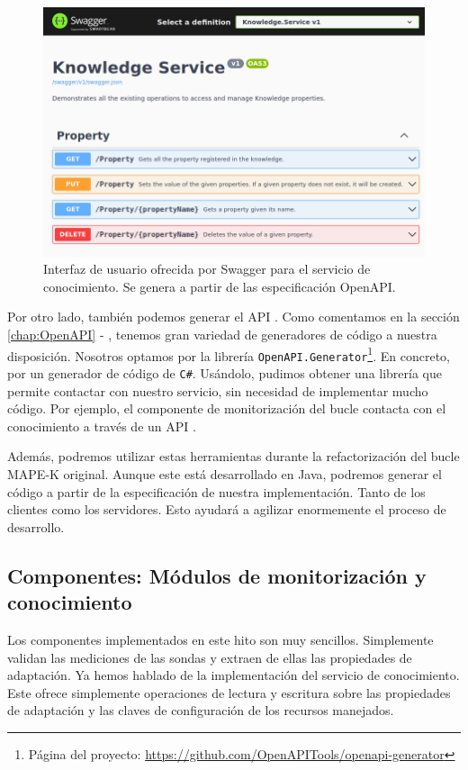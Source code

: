 \begin{figure}[htb]
  \centering
  \includegraphics[scale=1.5]{cap_implementacion/images/swagger-knowledge-ui}
  \caption{Interfaz de usuario ofrecida por Swagger para el servicio de conocimiento. Se genera a partir de las especificación OpenAPI.}
  \label{fig:swagger-knowledge-ui}
\end{figure}

Por otro lado, también podemos generar el API . Como comentamos en la sección \ref{chap:OpenAPI} - , tenemos gran variedad de generadores de código a nuestra disposición. Nosotros optamos por la librería \texttt{OpenAPI.Generator}\footnote{Página del proyecto: \url{https://github.com/OpenAPITools/openapi-generator}}. En concreto, por un generador de código de \verb|C#|. Usándolo, pudimos obtener una librería que permite contactar con nuestro servicio, sin necesidad de implementar mucho código. Por ejemplo, el componente de monitorización del bucle contacta con el conocimiento a través de un API .

Además, podremos utilizar estas herramientas durante la refactorización del bucle MAPE-K original. Aunque este está desarrollado en Java, podremos generar el código a partir de la especificación de nuestra implementación. Tanto de los clientes como los servidores. Esto ayudará a agilizar enormemente el proceso de desarrollo.

\subsection{Componentes: Módulos de monitorización y conocimiento}

Los componentes implementados en este hito son muy sencillos. Simplemente validan las mediciones de las sondas y extraen de ellas las propiedades de adaptación. Ya hemos hablado de la implementación del servicio de conocimiento. Este ofrece simplemente operaciones de lectura y escritura sobre las propiedades de adaptación y las claves de configuración de los recursos manejados.


